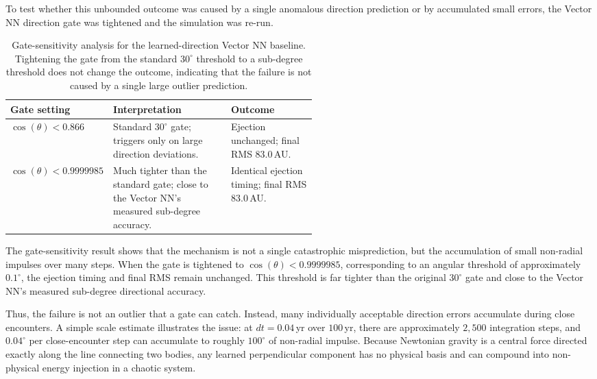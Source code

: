 \documentclass[12pt]{article}
\begin{document}
To test whether this unbounded outcome was caused by a single anomalous direction prediction or by accumulated small errors, the Vector NN direction gate was tightened and the simulation was re-run.

\begin{table}[H]
\centering
\caption{Gate-sensitivity analysis for the learned-direction Vector NN baseline. Tightening the gate from the standard $30^\circ$ threshold to a sub-degree threshold does not change the outcome, indicating that the failure is not caused by a single large outlier prediction.}
\label{tab:vector_gate_sensitivity}
\begin{tabularx}{\linewidth}{
    >{\raggedright\arraybackslash}p{0.24\linewidth}
    >{\raggedright\arraybackslash}X
    >{\raggedright\arraybackslash}p{0.28\linewidth}
}
\toprule
\textbf{Gate setting} & \textbf{Interpretation} & \textbf{Outcome} \\
\midrule
$\cos(\theta) < 0.866$
&
Standard $30^\circ$ gate; triggers only on large direction deviations.
&
Ejection unchanged; final RMS $83.0$\,AU.
\\
\addlinespace
$\cos(\theta) < 0.9999985$
&
Much tighter than the standard gate; close to the Vector NN's measured sub-degree accuracy.
&
Identical ejection timing; final RMS $83.0$\,AU.
\\
\bottomrule
\end{tabularx}
\end{table}

The gate-sensitivity result shows that the mechanism is not a single catastrophic misprediction, but the accumulation of small non-radial impulses over many steps. When the gate is tightened to $\cos(\theta) < 0.9999985$, corresponding to an angular threshold of approximately $0.1^\circ$, the ejection timing and final RMS remain unchanged. This threshold is far tighter than the original $30^\circ$ gate and close to the Vector NN's measured sub-degree directional accuracy. 

Thus, the failure is not an outlier that a gate can catch. Instead, many individually acceptable direction errors accumulate during close encounters. A simple scale estimate illustrates the issue: at $dt = 0.04$\,yr over $100$\,yr, there are approximately $2{,}500$ integration steps, and $0.04^\circ$ per close-encounter step can accumulate to roughly $100^\circ$ of non-radial impulse. Because Newtonian gravity is a central force directed exactly along the line connecting two bodies, any learned perpendicular component has no physical basis and can compound into non-physical energy injection in a chaotic system.
\end{document}
